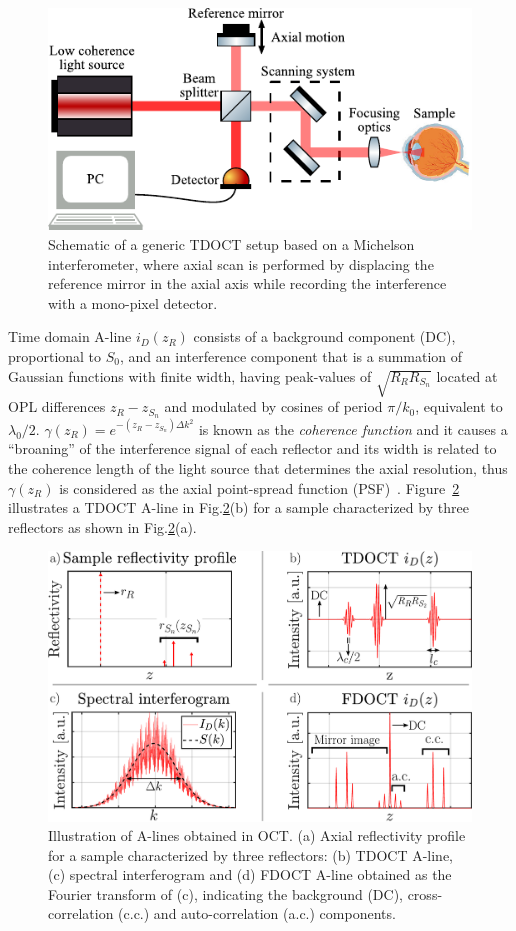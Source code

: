 \begin{figure}[htb!]
    \centering
    \includegraphics[width=.7\textwidth]{Figures/TheoreticalBasis/TDOCT_Scheme.pdf}
    \caption{Schematic of a generic TDOCT setup based on a Michelson interferometer, where axial scan is performed by displacing the reference mirror in the axial axis while recording the interference with a mono-pixel detector.}
    \label{fig:TDOCT_Scheme}
\end{figure}

Time domain A-line $i_D(z_R)$ consists of a background component (DC), proportional to $S_0$, and an interference component that is a summation of Gaussian functions with finite width, having peak-values of $\sqrt{R_RR_{S_n}}$ located at OPL differences $z_R-z_{S_n}$ and modulated by cosines of period $\pi/k_0$, equivalent to $\lambda_0/2$. $\gamma(z_R)=e^{-(z_R-z_{S_n})\Delta k^2}$ is known as the \textit{coherence function} and it causes a ``broaning'' of the interference signal of each reflector and its width is related to the coherence length of the light source that determines the axial resolution, thus $\gamma(z_R)$ is considered as the axial point-spread function (PSF)~\cite{Izatt2015_Theory}. Figure~\ref{fig:Alines} illustrates a TDOCT A-line in Fig.\ref{fig:Alines}(b) for a sample characterized by three reflectors as shown in Fig.\ref{fig:Alines}(a).

\begin{figure}[htb!]
    \centering
    \includegraphics[width=.7\textwidth]{Figures/TheoreticalBasis/Alines.pdf}
    \caption{Illustration of A-lines obtained in OCT. (a) Axial reflectivity profile for a sample characterized by three reflectors: (b) TDOCT A-line, (c) spectral interferogram and (d) FDOCT A-line obtained as the Fourier transform of (c), indicating the background (DC), cross-correlation (c.c.) and auto-correlation (a.c.) components.}
    \label{fig:Alines}
\end{figure}

